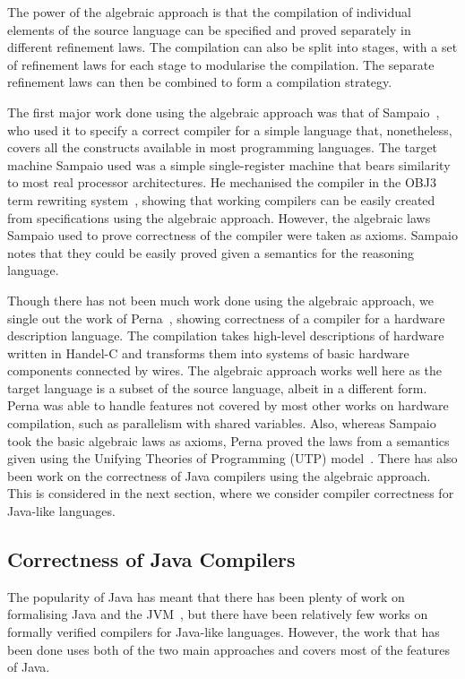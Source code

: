 \documentclass[a4paper,10pt]{report}
\begin{document}
The power of the algebraic approach is that the compilation of individual
elements of the source language can be specified and proved separately in
different refinement laws.  The compilation can also be split into stages, with
a set of refinement laws for each stage to modularise the compilation.  The
separate refinement laws can then be combined to form a compilation strategy.

The first major work done using the algebraic approach was that of
Sampaio~\cite{sampaio1993}, who used it to specify a correct compiler for a
simple language that, nonetheless, covers all the constructs available in most
programming languages. The target machine Sampaio used was a simple
single-register machine that bears similarity to most real processor
architectures.  He mechanised the compiler in the OBJ3 term rewriting
system~\cite{goguen1988}, showing that working compilers can be easily created
from specifications using the algebraic approach.  However, the algebraic laws
Sampaio used to prove correctness of the compiler were taken as axioms. Sampaio
notes that they could be easily proved given a semantics for the reasoning
language.

Though there has not been much work done using the algebraic approach, we single
out the work of Perna~\cite{perna2010, perna2011}, showing correctness of a
compiler for a hardware description language.  The compilation takes high-level
descriptions of hardware written in Handel-C and transforms them into systems of
basic hardware components connected by wires.  The algebraic approach works well
here as the target language is a subset of the source language, albeit in a
different form.  Perna was able to handle features not covered by most other
works on hardware compilation, such as parallelism with shared variables.  Also,
whereas Sampaio took the basic algebraic laws as axioms, Perna proved the laws
from a semantics given using the Unifying Theories of Programming (UTP)
model~\cite{hoare1998}.  There has also been work on the correctness of Java
compilers using the algebraic approach.  This is considered in the next section,
where we consider compiler correctness for Java-like languages.

\subsection{Correctness of Java Compilers}
\label{java-compiler-correctness-subsection}

The popularity of Java has meant that there has been plenty of work on
formalising Java and the JVM~\cite{hartel2001}, but there have been relatively
few works on formally verified compilers for Java-like languages.  However, the
work that has been done uses both of the two main approaches and covers most of
the features of Java.
\end{document}
